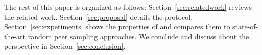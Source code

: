 The rest of this paper is organized as follows: Section~\ref{sec:relatedwork}
reviews the related work. Section~\ref{sec:proposal}
details the \SPRAY protocol. Section~\ref{sec:experiments} shows the properties
of \SPRAY and compares them to state-of-the-art random peer sampling
approaches. We conclude and discuss about the perspective in
Section~\ref{sec:conclusion}.

